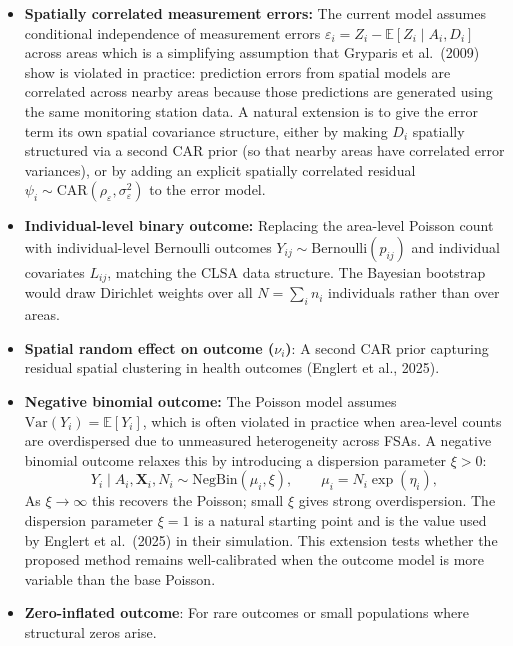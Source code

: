 \documentclass[11pt]{article}
\begin{document}
\begin{itemize}
\item \textbf{Spatially correlated measurement errors:} The current model assumes
conditional independence of measurement errors $\varepsilon_i = Z_i -
\mathbb{E}[Z_i \mid A_i, D_i]$ across areas which is a simplifying assumption that
Gryparis et al.\ (2009) show is violated in practice: prediction errors from spatial
models are correlated across nearby areas because those predictions are generated using
the same monitoring station data. A natural extension is to give the error term its own
spatial covariance structure, either by making $D_i$ spatially structured via a second
CAR prior (so that nearby areas have correlated error variances), or by adding an
explicit spatially correlated residual $\psi_i \sim \text{CAR}(\rho_\varepsilon,
\sigma_\varepsilon^2)$ to the error model.

\item \textbf{Individual-level binary outcome:} Replacing the area-level Poisson count
with individual-level Bernoulli outcomes $Y_{ij} \sim \text{Bernoulli}(p_{ij})$ and
individual covariates $L_{ij}$, matching the CLSA data structure. The Bayesian bootstrap
would draw Dirichlet weights over all $N = \sum_i n_i$ individuals rather than over areas.

\item \textbf{Spatial random effect on outcome ($\nu_i$)}: A second CAR prior capturing
residual spatial clustering in health outcomes (Englert et al., 2025).

\item \textbf{Negative binomial outcome:} The Poisson model assumes
$\text{Var}(Y_i) = \mathbb{E}[Y_i]$, which is often violated in practice when
area-level counts are overdispersed due to unmeasured heterogeneity across FSAs. A
negative binomial outcome relaxes this by introducing a dispersion parameter $\xi > 0$:
\begin{equation*}
Y_i \mid A_i, \mathbf{X}_i, N_i \sim \text{NegBin}(\mu_i, \xi), \qquad
\mu_i = N_i \exp(\eta_i),
\end{equation*}
As $\xi \to \infty$ this recovers the Poisson; small $\xi$ gives strong overdispersion.
The dispersion parameter $\xi = 1$ is a natural starting point and is the value used by
Englert et al.\ (2025) in their simulation. This extension tests whether the proposed
method remains well-calibrated when the outcome model is more variable than the base
Poisson.

\item \textbf{Zero-inflated outcome}: For rare outcomes or small populations where
structural zeros arise.


\end{itemize}
\end{document}
